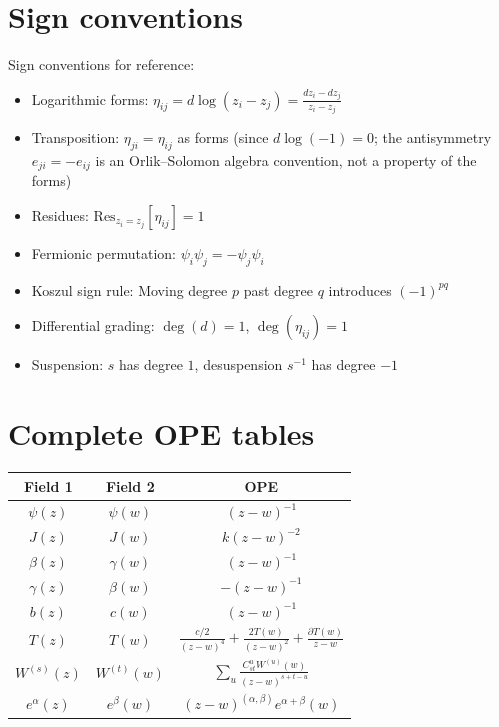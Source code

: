 \chapter{Sign conventions}

Sign conventions for reference:
\begin{itemize}
\item Logarithmic forms: $\eta_{ij} = d\log(z_i - z_j) = \frac{dz_i - dz_j}{z_i - z_j}$
\item Transposition: $\eta_{ji} = \eta_{ij}$ as forms (since $d\log(-1) = 0$; the antisymmetry $e_{ji} = -e_{ij}$ is an Orlik--Solomon algebra convention, not a property of the forms)
\item Residues: $\text{Res}_{z_i=z_j}[\eta_{ij}] = 1$
\item Fermionic permutation: $\psi_i\psi_j = -\psi_j\psi_i$
\item Koszul sign rule: Moving degree $p$ past degree $q$ introduces $(-1)^{pq}$
\item Differential grading: $\deg(d) = 1$, $\deg(\eta_{ij}) = 1$
\item Suspension: $s$ has degree $1$, desuspension $s^{-1}$ has degree $-1$
\end{itemize}
 
\chapter{Complete OPE tables}
 
\begin{center}
\begin{tabular}{|c|c|c|}
\hline
Field 1 & Field 2 & OPE \\
\hline
$\psi(z)$ & $\psi(w)$ & $(z-w)^{-1}$ \\
$J(z)$ & $J(w)$ & $k(z-w)^{-2}$ \\
$\beta(z)$ & $\gamma(w)$ & $(z-w)^{-1}$ \\
$\gamma(z)$ & $\beta(w)$ & $-(z-w)^{-1}$ \\
$b(z)$ & $c(w)$ & $(z-w)^{-1}$ \\
$T(z)$ & $T(w)$ & $\frac{c/2}{(z-w)^4} + \frac{2T(w)}{(z-w)^2} + \frac{\partial T(w)}{z-w}$ \\
$W^{(s)}(z)$ & $W^{(t)}(w)$ & $\sum_u \frac{C^u_{st} W^{(u)}(w)}{(z-w)^{s+t-u}}$ \\
$e^\alpha(z)$ & $e^\beta(w)$ & $(z-w)^{(\alpha,\beta)} e^{\alpha+\beta}(w)$ \\
\hline
\end{tabular}
\end{center}
 
